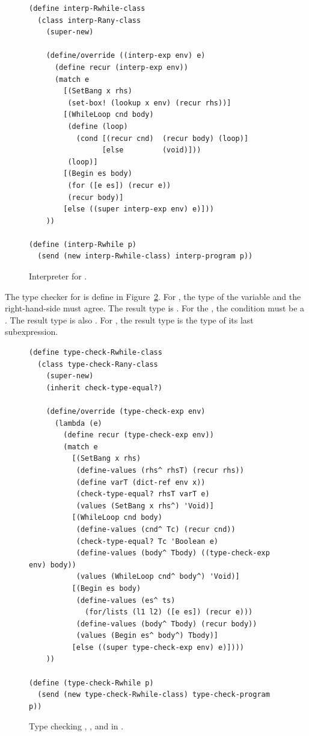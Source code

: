 \documentclass[11pt]{book}
\begin{document}
\begin{figure}[tbp]
\begin{lstlisting}[basicstyle=\ttfamily\footnotesize]
(define interp-Rwhile-class
  (class interp-Rany-class
    (super-new)

    (define/override ((interp-exp env) e)
      (define recur (interp-exp env))
      (match e
        [(SetBang x rhs)
         (set-box! (lookup x env) (recur rhs))]
        [(WhileLoop cnd body)
         (define (loop)
           (cond [(recur cnd)  (recur body) (loop)]
                 [else         (void)]))
         (loop)]
        [(Begin es body)
         (for ([e es]) (recur e))
         (recur body)]
        [else ((super interp-exp env) e)]))
    ))

(define (interp-Rwhile p)
  (send (new interp-Rwhile-class) interp-program p))
\end{lstlisting}
\caption{Interpreter for \LangLoop{}.}
\label{fig:interp-Rwhile}
\end{figure}

The type checker for \LangLoop{} is define in
Figure~\ref{fig:type-check-Rwhile}.  For , the type of the
variable and the right-hand-side must agree. The result type is
. For the , the condition must be a
. The result type is also .  For
, the result type is the type of its last subexpression.

\begin{figure}[tbp]
\begin{lstlisting}[basicstyle=\ttfamily\footnotesize]
(define type-check-Rwhile-class
  (class type-check-Rany-class
    (super-new)
    (inherit check-type-equal?)

    (define/override (type-check-exp env)
      (lambda (e)
        (define recur (type-check-exp env))
        (match e
          [(SetBang x rhs)
           (define-values (rhs^ rhsT) (recur rhs))
           (define varT (dict-ref env x))
           (check-type-equal? rhsT varT e)
           (values (SetBang x rhs^) 'Void)]
          [(WhileLoop cnd body)
           (define-values (cnd^ Tc) (recur cnd))
           (check-type-equal? Tc 'Boolean e)
           (define-values (body^ Tbody) ((type-check-exp env) body))
           (values (WhileLoop cnd^ body^) 'Void)]
          [(Begin es body)
           (define-values (es^ ts)
             (for/lists (l1 l2) ([e es]) (recur e)))
           (define-values (body^ Tbody) (recur body))
           (values (Begin es^ body^) Tbody)]
          [else ((super type-check-exp env) e)])))
    ))

(define (type-check-Rwhile p)
  (send (new type-check-Rwhile-class) type-check-program p))
\end{lstlisting}
\caption{Type checking , ,
    and  in \LangLoop{}.}
\label{fig:type-check-Rwhile}
\end{figure}
\end{document}
